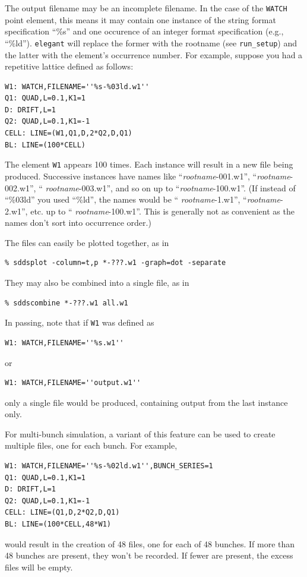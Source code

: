 The output filename may be an incomplete filename.  In the case of the
\verb|WATCH| point element, this means it may contain one instance of
the string format specification ``\%s'' and one occurence of an
integer format specification (e.g., ``\%ld'').  {\tt elegant} will
replace the former with the rootname (see
\verb|run_setup|) and the latter with the element's occurrence
number.  For example, suppose you had a repetitive lattice defined as
follows:
\begin{verbatim}
W1: WATCH,FILENAME=''%s-%03ld.w1''
Q1: QUAD,L=0.1,K1=1
D: DRIFT,L=1
Q2: QUAD,L=0.1,K1=-1
CELL: LINE=(W1,Q1,D,2*Q2,D,Q1)
BL: LINE=(100*CELL)
\end{verbatim}
The element \verb|W1| appears 100 times.  Each instance will result in
a new file being produced.  Successive instances have names like
``{\em rootname}-001.w1'', ``{\em rootname}-002.w1'', ``{\em
rootname}-003.w1'', and so on up to ``{\em rootname}-100.w1''.  (If
instead of ``\%03ld'' you used ``\%ld'', the names would be ``{\em
rootname}-1.w1'', ``{\em rootname}-2.w1'', etc. up to ``{\em
rootname}-100.w1''.  This is generally not as convenient as the names
don't sort into occurrence order.)

The files can easily be plotted together, as in 
\begin{verbatim}
% sddsplot -column=t,p *-???.w1 -graph=dot -separate 
\end{verbatim}
They may also be combined into a single file, as in
\begin{verbatim}
% sddscombine *-???.w1 all.w1 
\end{verbatim}

In passing, note that if \verb|W1| was defined as
\begin{verbatim}
W1: WATCH,FILENAME=''%s.w1''
\end{verbatim}
or 
\begin{verbatim}
W1: WATCH,FILENAME=''output.w1''
\end{verbatim}
only a single file would be produced, containing output from the last instance
only.

For multi-bunch simulation, a variant of this feature can be used to create multiple files, one for
each bunch. For example,
\begin{verbatim}
W1: WATCH,FILENAME=''%s-%02ld.w1'',BUNCH_SERIES=1
Q1: QUAD,L=0.1,K1=1
D: DRIFT,L=1
Q2: QUAD,L=0.1,K1=-1
CELL: LINE=(Q1,D,2*Q2,D,Q1)
BL: LINE=(100*CELL,48*W1)
\end{verbatim}
would result in the creation of 48 files, one for each of 48 bunches. If more than 48 bunches are present,
they won't be recorded. If fewer are present, the excess files will be empty.

